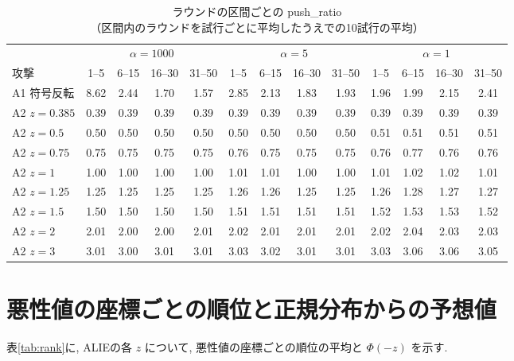 \documentclass[a4j, twocolumn, dvipdfmx]{jsarticle}
\newcommand{\PushRatio}{\textrm{push\_ratio}}
\begin{document}
\begin{table}[H]
\centering
\caption{ラウンドの区間ごとの \PushRatio{}（区間内のラウンドを試行ごとに平均したうえでの10試行の平均）}
\label{tab:seg-push}
\footnotesize
\tabcolsep=3.2pt
\begin{tabular}{@{}l@{\hspace{5pt}}cccc@{\hspace{8pt}}cccc@{\hspace{8pt}}cccc@{}}
\toprule
 & \multicolumn{4}{c}{$\alpha=1000$} & \multicolumn{4}{c}{$\alpha=5$} & \multicolumn{4}{c}{$\alpha=1$} \\
\cmidrule(lr){2-5}\cmidrule(lr){6-9}\cmidrule(l){10-13}
攻撃 & 1--5 & 6--15 & 16--30 & 31--50 & 1--5 & 6--15 & 16--30 & 31--50 & 1--5 & 6--15 & 16--30 & 31--50 \\
\midrule
A1 符号反転 & 8.62 & 2.44 & 1.70 & 1.57 & 2.85 & 2.13 & 1.83 & 1.93 & 1.96 & 1.99 & 2.15 & 2.41 \\
\midrule
A2 $z{=}0.385$ & 0.39 & 0.39 & 0.39 & 0.39 & 0.39 & 0.39 & 0.39 & 0.39 & 0.39 & 0.39 & 0.39 & 0.39 \\
A2 $z{=}0.5$ & 0.50 & 0.50 & 0.50 & 0.50 & 0.50 & 0.50 & 0.50 & 0.50 & 0.51 & 0.51 & 0.51 & 0.51 \\
A2 $z{=}0.75$ & 0.75 & 0.75 & 0.75 & 0.75 & 0.76 & 0.75 & 0.75 & 0.75 & 0.76 & 0.77 & 0.76 & 0.76 \\
A2 $z{=}1$ & 1.00 & 1.00 & 1.00 & 1.00 & 1.01 & 1.01 & 1.00 & 1.00 & 1.01 & 1.02 & 1.02 & 1.01 \\
A2 $z{=}1.25$ & 1.25 & 1.25 & 1.25 & 1.25 & 1.26 & 1.26 & 1.25 & 1.25 & 1.26 & 1.28 & 1.27 & 1.27 \\
A2 $z{=}1.5$ & 1.50 & 1.50 & 1.50 & 1.50 & 1.51 & 1.51 & 1.51 & 1.51 & 1.52 & 1.53 & 1.53 & 1.52 \\
A2 $z{=}2$ & 2.01 & 2.00 & 2.00 & 2.01 & 2.02 & 2.01 & 2.01 & 2.01 & 2.02 & 2.04 & 2.03 & 2.03 \\
A2 $z{=}3$ & 3.01 & 3.00 & 3.01 & 3.01 & 3.03 & 3.02 & 3.01 & 3.01 & 3.03 & 3.06 & 3.06 & 3.05 \\
\bottomrule
\end{tabular}
\end{table}

\section{悪性値の座標ごとの順位と正規分布からの予想値}
\label{sec:appendix-rank}

表\ref{tab:rank}に, ALIEの各 $z$ について, 悪性値の座標ごとの順位の平均と $\Phi(-z)$ を示す.
\end{document}
